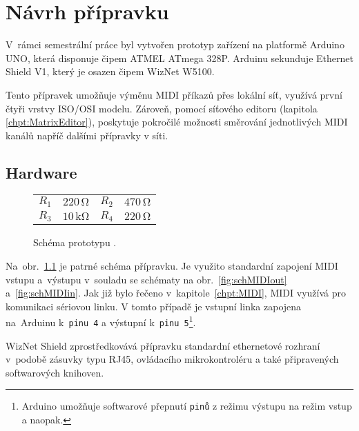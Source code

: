 
\chapter{Návrh přípravku}
V~rámci semestrální práce byl vytvořen prototyp zařízení na platformě Ar\-du\-ino UNO, která disponuje čipem ATMEL ATmega 328P. Ar\-du\-inu sekunduje Ether\-net Shield V1, který je osazen čipem WizNet W5100. 

Tento přípravek umožňuje výměnu \acs{MIDI} příkazů přes lokální síť, využívá první čtyři vrstvy ISO/OSI modelu. Zároveň, pomocí síťového editoru (kapitola \ref{chpt:MatrixEditor}), poskytuje pokročilé možnosti směrování jednotlivých \acs{MIDI} kanálů napříč dalšími přípravky v síti.

\section{Hardware}\label{chpt:Schema}
\begin{figure}[h]
    \centering
    
    \begin{tabular}{l c l c}
        \small
        $R_1$ & $220\,\mathrm{\Omega}$ & $R_2$ & $470\,\mathrm{\Omega}$ \\
        $R_3$ & $10\,\mathrm{k\Omega}$ & $R_4$ & $220\,\mathrm{\Omega}$
    \end{tabular}
    \caption{Schéma prototypu \cite{Indest}.} 
    \label{fig:schPrototype}
\end{figure}

Na~obr.~\ref{fig:schPrototype} je patrné schéma přípravku. Je využito standardní zapojení \acs{MIDI} vstupu a~výstupu v~souladu se schématy na obr.~\ref{fig:schMIDIout} a~\ref{fig:schMIDIin}. Jak již bylo řečeno v~kapitole~\ref{chpt:MIDI}, \acs{MIDI} využívá pro komunikaci sériovou linku. V tomto případě je vstupní linka zapojena na~Arduinu k~\texttt{pinu~4} a výstupní k~\texttt{pinu~5}\footnote{Arduino umožňuje softwarové přepnutí \texttt{pinů} z režimu výstupu na režim vstup a naopak.}. 

WizNet Shield zprostředkovává přípravku standardní ethernetové rozhraní v~podobě zásuvky typu RJ45, ovládacího mikrokontroléru a také připravených softwarových knihoven.


